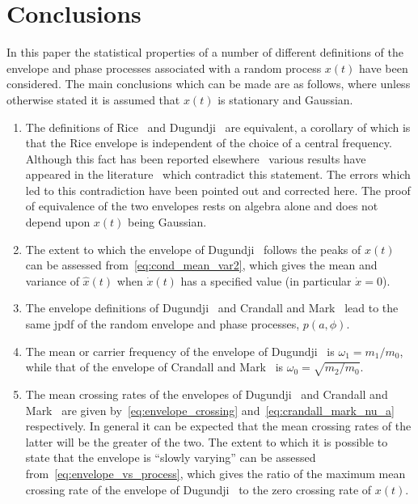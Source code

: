 \documentclass[12pt]{article}
\theoremstyle{plain}
\theoremstyle{definition}
\theoremstyle{remark}
\begin{document}
\section{Conclusions}
In this paper the statistical properties of a number of different definitions of the envelope and phase processes associated with a random process $x(t)$ have been considered. The main conclusions which can be made are as follows, where unless otherwise stated it is assumed that $x(t)$ is stationary and Gaussian.
\begin{enumerate}[label=(\arabic*)]
    \item The definitions of Rice~\cite{rice1954} and Dugundji~\cite{dugundji1958} are equivalent, a corollary of which is that the Rice envelope is independent of the choice of a central frequency. Although this fact has been reported elsewhere~\cite{dugundji1958} various results have appeared in the literature~\cite{lin1967,lin1976} which contradict this statement. The errors which led to this contradiction have been pointed out and corrected here. The proof of equivalence of the two envelopes rests on algebra alone and does not depend upon $x(t)$ being Gaussian.
    \item The extent to which the envelope of Dugundji~\cite{dugundji1958} follows the peaks of $x(t)$ can be assessed from~\eqref{eq:cond_mean_var2}, which gives the mean and variance of $\hat{x}(t)$ when $\dot{x}(t)$ has a specified value (in particular $\dot{x}=0$).
    \item The envelope definitions of Dugundji~\cite{dugundji1958} and Crandall and Mark~\cite{crandall1963} lead to the same jpdf of the random envelope and phase processes, $p(a, \phi)$.
    \item The mean or carrier frequency of the envelope of Dugundji~\cite{dugundji1958} is $\omega_1 = m_1 / m_0$, while that of the envelope of Crandall and Mark~\cite{crandall1963} is $\omega_0 = \sqrt{m_2 / m_0}$.
    \item The mean crossing rates of the envelopes of Dugundji~\cite{dugundji1958} and Crandall and Mark~\cite{crandall1963} are given by~\eqref{eq:envelope_crossing} and~\eqref{eq:crandall_mark_nu_a} respectively. In general it can be expected that the mean crossing rates of the latter will be the greater of the two. The extent to which it is possible to state that the envelope is ``slowly varying'' can be assessed from~\eqref{eq:envelope_vs_process}, which gives the ratio of the maximum mean crossing rate of the envelope of Dugundji~\cite{dugundji1958} to the zero crossing rate of $x(t)$.
\end{enumerate}
\end{document}
